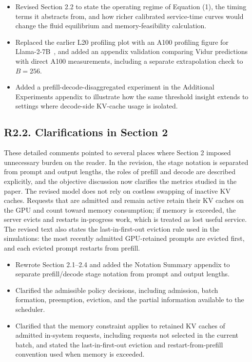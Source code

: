 \changes
\begin{itemize}
    \item Revised Section 2.2 to state the operating regime of Equation (1), the timing terms it abstracts from, and how richer calibrated service-time curves would change the fluid equilibrium and memory-feasibility calculation.
    \item Replaced the earlier L20 profiling plot with an A100 profiling figure for Llama-2-7B~\citep{nvidia-a100-specs,huggingface-llama2-docs}, and added an appendix validation comparing Vidur predictions with direct A100 measurements, including a separate extrapolation check to \(B=256\).
    \item Added a prefill-decode-disaggregated experiment in the Additional Experiments appendix to illustrate how the same threshold insight extends to settings where decode-side KV-cache usage is isolated.
\end{itemize}

\subsection*{R2.2. Clarifications in Section 2}


\response These detailed comments pointed to several places where Section 2 imposed unnecessary burden on the reader. In the revision, the stage notation is separated from prompt and output lengths, the roles of prefill and decode are described explicitly, and the objective discussion now clarifies the metrics studied in the paper. The revised model does not rely on costless swapping of inactive KV caches. Requests that are admitted and remain active retain their KV caches on the GPU and count toward memory consumption; if memory is exceeded, the server evicts and restarts in-progress work, which is treated as lost useful service. The revised text also states the last-in-first-out eviction rule used in the simulations: the most recently admitted GPU-retained prompts are evicted first, and each evicted prompt restarts from prefill.

\changes
\begin{itemize}
    \item Rewrote Section 2.1--2.4 and added the Notation Summary appendix to separate prefill/decode stage notation from prompt and output lengths.
    \item Clarified the admissible policy decisions, including admission, batch formation, preemption, eviction, and the partial information available to the scheduler.
    \item Clarified that the memory constraint applies to retained KV caches of admitted in-system requests, including requests not selected in the current batch, and stated the last-in-first-out eviction and restart-from-prefill convention used when memory is exceeded.
\end{itemize}

